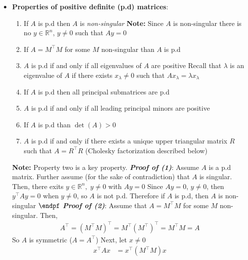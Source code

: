 \documentclass{report}
\begin{document}
\begin{itemize}
        \item \textbf{Properties of positive definite (p.d) matrices}:
            \begin{enumerate}
                \item If $A$ is p.d then $A$ is \textit{non-singular}
                    \bigbreak \noindent 
                    \textbf{Note:} Since $A$ is non-singular there is no $y \in \mathbb{R}^{n}$, $y\ne 0$ such that $Ay = 0$
                \item If $A = M^{\top}M$ for some $M$ non-singular than $A$ is p.d
                \item $A$ is p.d if and only if all eigenvalues of $A$ are positive
                    \bigbreak \noindent 
                    Recall that $\lambda$ is an eigenvalue of $A$ if there exists $x_{\lambda} \ne 0$ such that $Ax_{\lambda}  = \lambda x_{\lambda}$
                \item If $A$ is p.d then all principal submatrices are p.d
                \item $A$ is p.d if and only if all leading principal minors are positive
                \item If $A$ is p.d than $\det(A) > 0$
                \item $A$ is p.d if and only if there exists a unique upper triangular matrix $R$ such that $A = R^{\top}R$ (Cholesky factorization described below)
            \end{enumerate}
            \textbf{Note:} Property two is a key property.
            \bigbreak \noindent 
            \textbf{\textit{Proof of (1)}}: Assume $A$ is a p.d matrix. Further assume (for the sake of contradiction) that $A$ is singular. Then, there exits $y \in \mathbb{R}^{n},\; y \ne 0 $ with $Ay=0$
            \bigbreak \noindent 
            Since $Ay = 0$, $y\ne 0$, then $y^{\top}Ay=0$ when $y\ne 0$, so $A$ is not p.d.
            \bigbreak \noindent 
            Therefore if $A$ is p.d, then $A$ is non-singular $\endpf$
            \bigbreak \noindent 
            \textbf{\textit{Proof of (2)}}: Assume that $A  = M^{\top}M$ for some $M$ non-singular. Then,
            \begin{align*}
                A^{\top} = (M^{\top}M)^{\top} = M^{\top}(M^{\top})^{\top} = M^{\top}M = A
            \end{align*}
            So $A$ is symmetric ($A = A^{\top}$)
            \bigbreak \noindent 
            Next, let $x \ne 0$
            \begin{align*}
                x^{\top}Ax &= x^{\top}(M^{\top}M)x \\

\end{align*}
\end{itemize}
\end{document}
